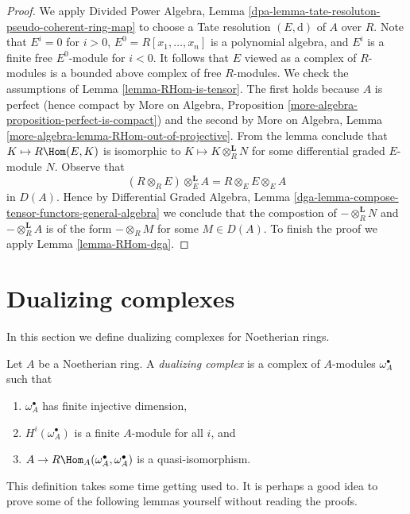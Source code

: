 \begin{proof}
We apply Divided Power Algebra, Lemma
\ref{dpa-lemma-tate-resoluton-pseudo-coherent-ring-map}
to choose a Tate resolution $(E, \text{d})$ of $A$ over $R$.
Note that $E^i = 0$ for $i > 0$, $E^0 = R[x_1, \ldots, x_n]$
is a polynomial algebra, and $E^i$ is a finite free $E^0$-module
for $i < 0$. It follows that $E$ viewed as a complex of $R$-modules
is a bounded above complex of free $R$-modules.
We check the assumptions of Lemma \ref{lemma-RHom-is-tensor}.
The first holds because $A$ is perfect
(hence compact by More on Algebra, Proposition
\ref{more-algebra-proposition-perfect-is-compact})
and the second by
More on Algebra, Lemma \ref{more-algebra-lemma-RHom-out-of-projective}.
From the lemma conclude that $K \mapsto R\Hom(E, K)$ is
isomorphic to $K \mapsto K \otimes_R^\mathbf{L} N$ for
some differential graded $E$-module $N$. Observe that
$$
(R \otimes_R E) \otimes_E^\mathbf{L} A = R \otimes_E E \otimes_E A
$$
in $D(A)$. Hence by Differential Graded Algebra, Lemma
\ref{dga-lemma-compose-tensor-functors-general-algebra}
we conclude that the compostion of
$- \otimes_R^\mathbf{L} N$ and $- \otimes_R^\mathbf{L} A$
is of the form $- \otimes_R M$ for some $M \in D(A)$.
To finish the proof we apply Lemma \ref{lemma-RHom-dga}.
\end{proof}





\section{Dualizing complexes}
\label{section-dualizing}

\noindent
In this section we define dualizing complexes for Noetherian rings.

\begin{definition}
\label{definition-dualizing}
Let $A$ be a Noetherian ring. A {\it dualizing complex} is a
complex of $A$-modules $\omega_A^\bullet$ such that
\begin{enumerate}
\item $\omega_A^\bullet$ has finite injective dimension,
\item $H^i(\omega_A^\bullet)$ is a finite $A$-module for all $i$, and
\item $A \to R\Hom_A(\omega_A^\bullet, \omega_A^\bullet)$
is a quasi-isomorphism.
\end{enumerate}
\end{definition}

\noindent
This definition takes some time getting used to. It is perhaps a good
idea to prove some of the following lemmas yourself without reading
the proofs.

